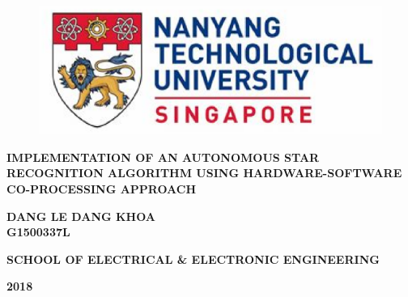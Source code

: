 \documentclass[dvips,a4paper,12pt]{report}
\begin{document}
	\thispagestyle{empty}
	\begin{center}
		
		\begin{figure}
			\centering
			\vspace{2mm}
			\includegraphics[scale=0.6]{images/NTU_logo.eps}
				\label{fig:NTU_Logo}
		\end{figure}

		\vspace{5.0cm}
		\textbf{\Large \MakeUppercase{IMPLEMENTATION OF AN AUTONOMOUS STAR RECOGNITION ALGORITHM USING HARDWARE-SOFTWARE CO-PROCESSING APPROACH}}
		
		\vspace{\fill}
		
		\textbf{\MakeUppercase{DANG LE DANG KHOA}} \\
		\textbf{\MakeUppercase{G1500337L}} \\
		
		\vspace{\fill}
		
		\textbf{SCHOOL OF ELECTRICAL \& ELECTRONIC ENGINEERING}
		
		\textbf{2018}
		
	\end{center}
	
\end{document}
